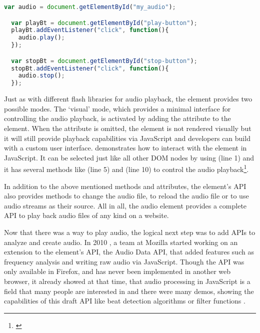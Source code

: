 \begin{lstlisting}[language=JavaScript, caption=Interacting with the audio element in JavaScript, label=lst:audioelementjs]
  var audio = document.getElementById("my_audio");

  var playBt = document.getElementById("play-button");
  playBt.addEventListener("click", function(){
    audio.play();
  });

  var stopBt = document.getElementById("stop-button");
  stopBt.addEventListener("click", function(){
    audio.stop();
  });
\end{lstlisting}

Just as with different flash libraries for audio playback, the  element provides two possible modes. The `visual' mode, which provides a minimal interface for controlling the audio playback, is activated by adding the  attribute to the element. When the  attribute is omitted, the element is not rendered visually but it will still provide playback capabilities via JavaScript and developers can build with a custom user interface.  demonstrates how to interact with the  element in JavaScript. It can be selected just like all other DOM nodes by using  (line 1) and it has several methods like  (line 5) and  (line 10) to control the audio playback\footnote{\cite[Media elements]{w32014html5}}.

In addition to the above mentioned methods and attributes, the element's API also provides methods to change the audio file, to reload the audio file or to use audio streams as their source. All in all, the audio element provides a complete API to play back audio files of any kind on a website.

Now that there was a way to play audio, the logical next step was to add APIs to analyze and create audio. In 2010 \cite{kirn2010soundsynth}, a team at Mozilla started working on an extension to the  element's API, the Audio Data API, that added features such as frequency analysis and writing raw audio via JavaScript. Though the API was only available in Firefox, and has never been implemented in another web browser, it already showed at that time, that audio processing in JavaScript is a field that many people are interested in and there were many demos, showing the capabilities of this draft API like beat detection algorithms or filter functions \cite[chapter: Working Audio Data Demos]{humphrey2013audiodata}.


